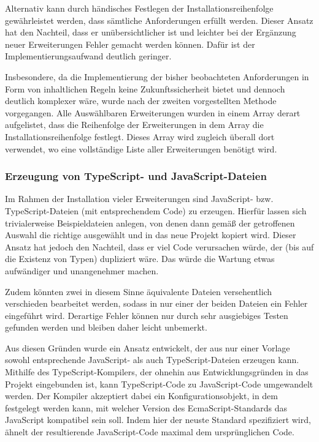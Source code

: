 Alternativ kann durch händisches Festlegen der Installationsreihenfolge gewährleistet werden, dass sämtliche Anforderungen erfüllt werden. Dieser Ansatz hat den Nachteil, dass er unübersichtlicher ist und leichter bei der Ergänzung neuer Erweiterungen Fehler gemacht werden können. Dafür ist der Implementierungsaufwand deutlich geringer.

Insbesondere, da die Implementierung der bisher beobachteten Anforderungen in Form von inhaltlichen Regeln keine Zukunftssicherheit bietet und dennoch deutlich komplexer wäre, wurde nach der zweiten vorgestellten Methode vorgegangen. Alle Auswählbaren Erweiterungen wurden in einem Array derart aufgelistet, dass die Reihenfolge der Erweiterungen in dem Array die Installationsreihenfolge festlegt. Dieses Array wird zugleich überall dort verwendet, wo eine vollständige Liste aller Erweiterungen benötigt wird.

\subsubsection{Erzeugung von TypeScript- und JavaScript-Dateien}
Im Rahmen der Installation vieler Erweiterungen sind JavaScript- bzw. TypeScript-Dateien (mit entsprechendem Code) zu erzeugen. Hierfür lassen sich trivialerweise Beispieldateien anlegen, von denen dann gemäß der getroffenen Auswahl die richtige ausgewählt und in das neue Projekt kopiert wird. Dieser Ansatz hat jedoch den Nachteil, dass er viel Code verursachen würde, der (bis auf die Existenz von Typen) dupliziert wäre. Das würde die Wartung etwas aufwändiger und unangenehmer machen.

Zudem könnten zwei in diesem Sinne äquivalente Dateien versehentlich verschieden bearbeitet werden, sodass in nur einer der beiden Dateien ein Fehler eingeführt wird. Derartige Fehler können nur durch sehr ausgiebiges Testen gefunden werden und bleiben daher leicht unbemerkt.

Aus diesen Gründen wurde ein Ansatz entwickelt, der aus nur einer Vorlage sowohl entsprechende JavaScript- als auch TypeScript-Dateien erzeugen kann. Mithilfe des TypeScript-Kompilers, der ohnehin aus Entwicklungsgründen in das Projekt eingebunden ist, kann TypeScript-Code zu JavaScript-Code umgewandelt werden. Der Kompiler akzeptiert dabei ein Konfigurationsobjekt, in dem festgelegt werden kann, mit welcher Version des EcmaScript-Standards das JavaScript kompatibel sein soll. Indem hier der neuste Standard spezifiziert wird, ähnelt der resultierende JavaScript-Code maximal dem ursprünglichen Code.

